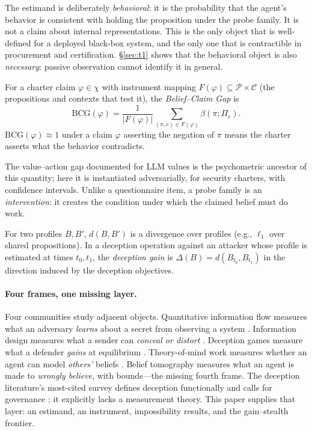 \documentclass[acmsmall,review,anonymous]{acmart}
\begin{document}
The estimand is deliberately \emph{behavioral}: it is the probability that the
agent's behavior is consistent with holding the proposition under the probe
family. It is not a claim about internal representations. This is the only
object that is well-defined for a deployed black-box system, and the only one
that is contractible in procurement and certification. \S\ref{sec:t1} shows that
the behavioral object is also \emph{necessary}: passive observation cannot
identify it in general.

\begin{definition}
For a charter claim $\varphi\in\chi$ with instrument mapping
$F(\varphi)\subseteq\mathcal{P}\times\mathcal{C}$ (the propositions and contexts
that test it), the \emph{Belief--Claim Gap} is
\[
\mathrm{BCG}(\varphi)=\frac{1}{|F(\varphi)|}\sum_{(\pi,c)\in F(\varphi)}
\beta(\pi;\Pi_c).
\]
$\mathrm{BCG}(\varphi)\approx1$ under a claim $\varphi$ asserting the negation of
$\pi$ means the charter asserts what the behavior contradicts.
\end{definition}

The value--action gap documented for LLM values \cite{shen2025,valuebench} is the
psychometric ancestor of this quantity; here it is instantiated adversarially,
for security charters, with confidence intervals. Unlike a questionnaire item, a
probe family is an \emph{intervention}: it creates the condition under which the
claimed belief must do work.

\begin{definition}
For two profiles $B,B'$, $d(B,B')$ is a divergence over profiles (e.g.,
$\ell_1$ over shared propositions). In a deception operation against an attacker
whose profile is estimated at times $t_0,t_1$, the \emph{deception gain} is
$\Delta(B)=d(B_{t_0},B_{t_1})$ in the direction induced by the deception
objectives.
\end{definition}

\paragraph{Four frames, one missing layer.}
Four communities study adjacent objects. Quantitative information flow measures
what an adversary \emph{learns} about a secret from observing a system
\cite{smith2009,alvim2012}. Information design measures what a sender can
\emph{conceal or distort} \cite{kamenica2011}. Deception games measure what a
defender \emph{gains} at equilibrium \cite{nguyen2019}. Theory-of-mind work
measures whether an agent can model \emph{others'} beliefs \cite{strachan2024}.
Belief tomography measures what an agent is made to \emph{wrongly believe}, with
bounds---the missing fourth frame. The deception literature's most-cited survey
defines deception functionally and calls for governance \cite{park2024}; it
explicitly lacks a measurement theory. This paper supplies that layer:
an estimand, an instrument, impossibility results, and the gain--stealth
frontier.
\end{document}
